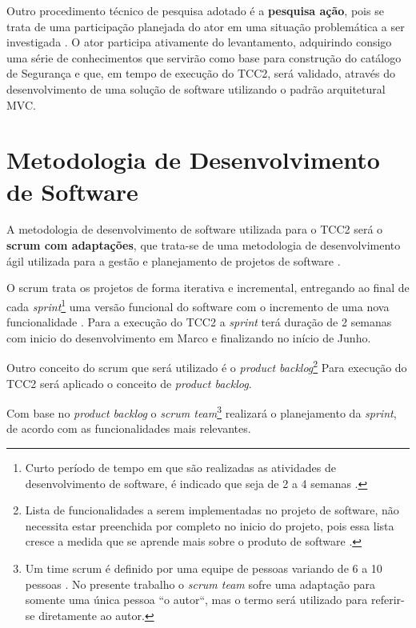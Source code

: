 Outro procedimento técnico de pesquisa adotado é a \textbf{pesquisa ação}, pois se trata de uma participação planejada do ator em uma situação problemática a ser investigada \cite{fonseca2002metodologia}. O ator participa ativamente do levantamento, adquirindo consigo uma série de conhecimentos que servirão como base para construção do catálogo de Segurança e que, em tempo de execução do TCC2, será validado, através do desenvolvimento de uma solução de software utilizando o padrão arquitetural MVC. 

\section{Metodologia de Desenvolvimento de Software}
\label{sec:metodologiaDeDesenvolvimentoDeSoftware}

A metodologia de desenvolvimento de software utilizada para o TCC2 será o \textbf{scrum com adaptações}, que trata-se de uma metodologia de desenvolvimento ágil utilizada para a gestão e planejamento de projetos de software \cite{schwaber2002agile}. 

O scrum trata os projetos de forma iterativa e incremental, entregando ao final de cada \textit{sprint}\footnote[1]{Curto período de tempo em que são realizadas as atividades de desenvolvimento de software, é indicado que seja de 2 a 4 semanas \cite{schwaber2002agile}.} uma versão funcional do software com o incremento de uma nova funcionalidade \cite{schwaber2002agile}. Para a execução do TCC2 a \textit{sprint} terá duração de 2 semanas com inicio do desenvolvimento em Marco e finalizando no início de Junho. 

Outro conceito do scrum que será utilizado é o \textit{product backlog}\footnote[2]{Lista de funcionalidades a serem implementadas no projeto de software, não necessita estar preenchida por completo no inicio do projeto, pois essa lista cresce a medida que se aprende mais sobre o produto de software \cite{schwaber2002agile}.} Para execução do TCC2 será aplicado o conceito de \textit{product backlog}.

Com base no \textit{product backlog} o \textit{scrum team}\footnote[3]{Um time scrum é definido por uma equipe de pessoas variando de 6 a 10 pessoas \cite{schwaber2002agile}. No presente trabalho o \textit{scrum team} sofre uma adaptação para somente uma única pessoa ``o autor``, mas o termo será utilizado para referir-se diretamente ao autor.} realizará o planejamento da \textit{sprint}, de acordo com as funcionalidades mais relevantes. 

